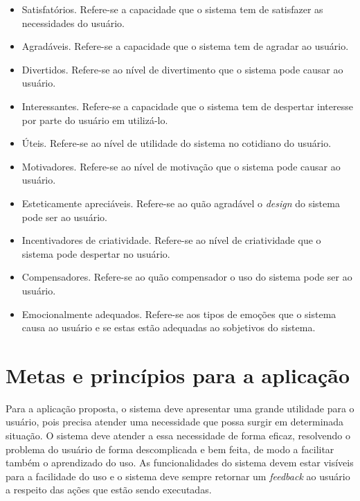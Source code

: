     \begin{itemize}
       \item Satisfatórios.
       \subitem Refere-se a capacidade que o sistema tem de satisfazer as necessidades do usuário.

       \item Agradáveis.
       \subitem Refere-se a capacidade que o sistema tem de agradar ao usuário.

       \item Divertidos.
       \subitem Refere-se ao nível de divertimento que o sistema pode causar ao usuário.

       \item Interessantes.
       \subitem Refere-se a capacidade que o sistema tem de despertar interesse por parte do usuário em utilizá-lo.

       \item Úteis.
       \subitem Refere-se ao nível de utilidade do sistema no cotidiano do usuário.

       \item Motivadores.
       \subitem Refere-se ao nível de motivação que o sistema pode causar ao usuário.

       \item Esteticamente apreciáveis.
       \subitem Refere-se ao quão agradável o \textit{design} do sistema pode ser ao usuário.

       \item Incentivadores de criatividade.
       \subitem Refere-se ao nível de criatividade que o sistema pode despertar no usuário.

       \item Compensadores.
       \subitem Refere-se ao quão compensador o uso do sistema pode ser ao usuário.

       \item Emocionalmente adequados.
       \subitem Refere-se aos tipos de emoções que o sistema causa ao usuário e se estas estão adequadas ao sobjetivos do sistema.
    \end{itemize}    
    
    \section{Metas e princípios para a aplicação}
    
      Para a aplicação proposta, o sistema deve apresentar uma grande utilidade para o usuário, pois precisa atender uma necessidade
      que possa surgir em determinada situação. O sistema deve atender a essa necessidade de forma eficaz, resolvendo o problema
      do usuário de forma descomplicada e bem feita, de modo a facilitar também o aprendizado do uso. As funcionalidades do sistema
      devem estar visíveis para a facilidade do uso e o sistema deve sempre retornar um \textit{feedback} ao usuário a respeito
      das ações que estão sendo executadas.
      
